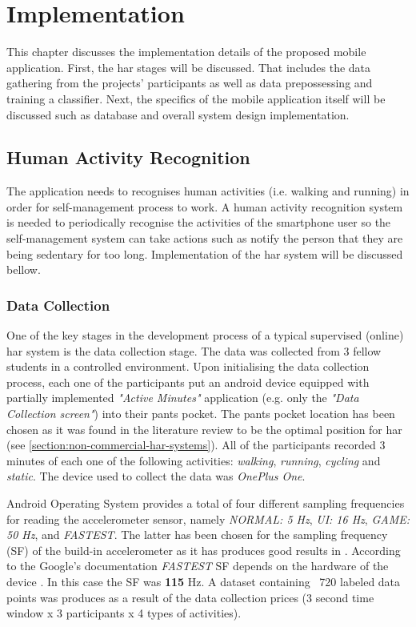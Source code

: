 \chapter{Implementation}
This chapter discusses the implementation details of the proposed mobile application. First, the \gls{har} stages will be discussed. That includes the data gathering from the projects' participants as well as data prepossessing and training a classifier. Next, the specifics of the mobile application itself will be discussed such as database and overall system design implementation.


\section{Human Activity Recognition}
The application needs to recognises human activities (i.e. walking and running) in order for self-management process to work. A human activity recognition system is needed to periodically recognise the activities of the smartphone user so the self-management system can take actions such as notify the person that they are being sedentary for too long. Implementation of the \gls{har} system will be discussed bellow.

    \subsection{Data Collection}
    One of the key stages in the development process of a typical supervised (online) \gls{har} system is the data collection stage. The data was collected from 3 fellow students in a controlled environment. Upon initialising the data collection process, each one of the participants put an android device equipped with partially implemented \textit{"Active Minutes"} application (e.g. only the \textit{"Data Collection screen"}) into their pants pocket. The pants pocket location has been chosen as it was found in the literature review to be the optimal position for \gls{har} (see \ref{section:non-commercial-har-systems}). All of the participants recorded 3 minutes of each one of the following activities: \textit{walking}, \textit{running}, \textit{cycling} and \textit{static}. The device used to collect the data was \textit{OnePlus One}. 
    
    Android Operating System provides a total of four different sampling frequencies for reading the accelerometer sensor, namely \textit{NORMAL: 5 Hz}, \textit{UI: 16 Hz}, \textit{GAME: 50 Hz}, and \textit{FASTEST}. The latter has been chosen for the sampling frequency (SF) of the build-in accelerometer as it has produces good results in \citet[3-5]{lee2016}. According to the Google's documentation \textit{FASTEST} SF depends on the hardware of the device \citep{googlesensormanager2017}. In this case the SF was \textbf{115} Hz. A dataset containing ~720 labeled data points was produces as a result of the data collection prices (3 second time window x 3 participants x 4 types of activities).